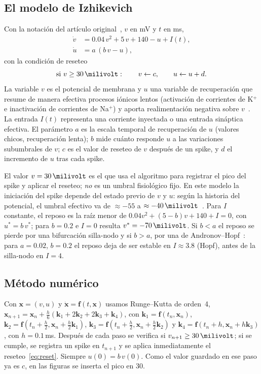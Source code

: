 \documentclass[10pt,a4paper,twocolumn]{article}
\begin{document}
\subsection{El modelo de Izhikevich}
Con la notación del artículo original~\cite{izhikevich2003}, $v$ en mV y $t$ en ms,
\begin{align}
  \dot v &= \num{0.04}\,v^2 + 5\,v + 140 - u + I(t), \label{eq:v}\\
  \dot u &= a\,(b\,v - u), \label{eq:u}
\end{align}
con la condición de reseteo
\begin{equation}
  \text{si } v \geq \SI{30}{\milivolt}: \qquad v \leftarrow c, \qquad u \leftarrow u + d .
  \label{eq:reset}
\end{equation}
La variable $v$ es el potencial de membrana y $u$ una variable de recuperación que
resume de manera efectiva procesos iónicos lentos (activación de corrientes de K$^+$ e
inactivación de corrientes de Na$^+$) y aporta realimentación negativa sobre
$v$~\cite{izhikevich2003}. La entrada $I(t)$ representa una corriente inyectada o una
entrada sináptica efectiva. El parámetro $a$ es la escala temporal de recuperación de
$u$ (valores chicos, recuperación lenta); $b$ mide cuánto responde $u$ a las
variaciones subumbrales de $v$; $c$ es el valor de reseteo de $v$ después de un spike,
y $d$ el incremento de $u$ tras cada spike.

El valor $v=\SI{30}{\milivolt}$ es el que usa el algoritmo para registrar el pico del
spike y aplicar el reseteo; \emph{no} es un umbral fisiológico fijo. En este modelo la
iniciación del spike depende del estado previo de $v$ y $u$: según la historia del
potencial, el umbral efectivo va de $\approx-55$ a
$\approx\SI{-40}{\milivolt}$~\cite{izhikevich2003}. Para $I$ constante, el reposo es la
raíz menor de $\num{0.04}v^2+(5-b)v+140+I=0$, con $u^*=b\,v^*$; para $b=\num{0.2}$ e
$I=0$ resulta $v^*=\SI{-70}{\milivolt}$. Si $b<a$ el reposo se pierde por una
bifurcación silla-nodo y si $b>a$, por una de Andronov--Hopf~\cite{izhikevich2003}:
para $a=\num{0.02}$, $b=\num{0.2}$ el reposo deja de ser estable en $I\approx\num{3.8}$
(Hopf), antes de la silla-nodo en $I=4$.

\subsection{Método numérico}
Con $\mathbf{x}=(v,u)$ y $\dot{\mathbf{x}}=\mathbf{f}(t,\mathbf{x})$ usamos Runge--Kutta
de orden~4,
$\mathbf{x}_{n+1} = \mathbf{x}_n + \tfrac{h}{6}(\mathbf{k}_1 + 2\mathbf{k}_2 + 2\mathbf{k}_3 + \mathbf{k}_4)$,
con $\mathbf{k}_1=\mathbf{f}(t_n,\mathbf{x}_n)$,
$\mathbf{k}_{2}=\mathbf{f}(t_n+\tfrac h2,\mathbf{x}_n+\tfrac h2\mathbf{k}_{1})$,
$\mathbf{k}_{3}=\mathbf{f}(t_n+\tfrac h2,\mathbf{x}_n+\tfrac h2\mathbf{k}_{2})$ y
$\mathbf{k}_4=\mathbf{f}(t_n+h,\mathbf{x}_n+h\mathbf{k}_3)$, con $h=\num{0.1}$\,ms.
Después de cada paso se verifica si $v_{n+1}\geq\SI{30}{\milivolt}$; si se cumple, se
registra un spike en $t_{n+1}$ y se aplica inmediatamente el reseteo~\eqref{eq:reset}.
Siempre $u(0)=b\,v(0)$. Como el valor guardado en ese paso ya es $c$, en las figuras se
inserta el pico en \SI{30}{\milivolt}.
\end{document}
